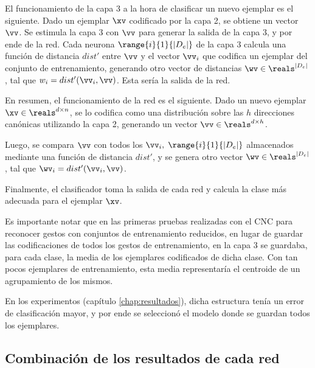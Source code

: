 

El funcionamiento de la capa 3 a la hora de clasificar un nuevo ejemplar es el siguiente. Dado un ejemplar $\xv$ codificado por la capa 2, se obtiene un vector $\vv$. Se estimula la capa 3 con $\vv$ para generar la salida de la capa 3, y por ende de la red. Cada neurona $\range{i}{1}{|D_e|}$ de la capa 3 calcula una función de distancia $dist'$ entre $\vv$ y el vector $\vv_i$ que codifica un ejemplar del conjunto de entrenamiento, generando otro vector de distancias $\wv \in \reals^{|D_e|}$, tal que $w_i=dist'(\vv_i,\vv)$. Esta sería la salida de la red.



En resumen, el funcionamiento de la red es el siguiente. Dado un nuevo ejemplar $\xv \in \reals^{d \times n}$, se lo codifica como una distribución sobre las $h$ direcciones canónicas utilizando la capa 2, generando un vector $\vv \in \reals^{d \times h}$. 

Luego, se compara $\vv$ con todos los $\vv_i, \; \range{i}{1}{|D_e|}$ almacenados mediante una función de distancia $dist'$, y se genera otro vector $\wv \in \reals^{|D_e|}$, tal que $\wv_i=dist'(\vv_i,\vv)$.
 

Finalmente, el clasificador toma la salida de cada red y calcula la clase más adecuada para el ejemplar $\xv$.

Es importante notar que en las primeras pruebas realizadas con el CNC para reconocer gestos con conjuntos de entrenamiento reducidos, en lugar de guardar las codificaciones de todos los gestos de entrenamiento, en la capa 3 se guardaba, para cada clase, la media de los ejemplares codificados de dicha clase. Con tan pocos ejemplares de entrenamiento, esta media representaría el centroide de un agrupamiento de los mismos. 

En los experimentos (capítulo \ref{chap:resultados}), dicha estructura tenía un error de clasificación mayor, y por ende se seleccionó el modelo donde se guardan todos los ejemplares.

\subsection{Combinación de los resultados de cada red} 

